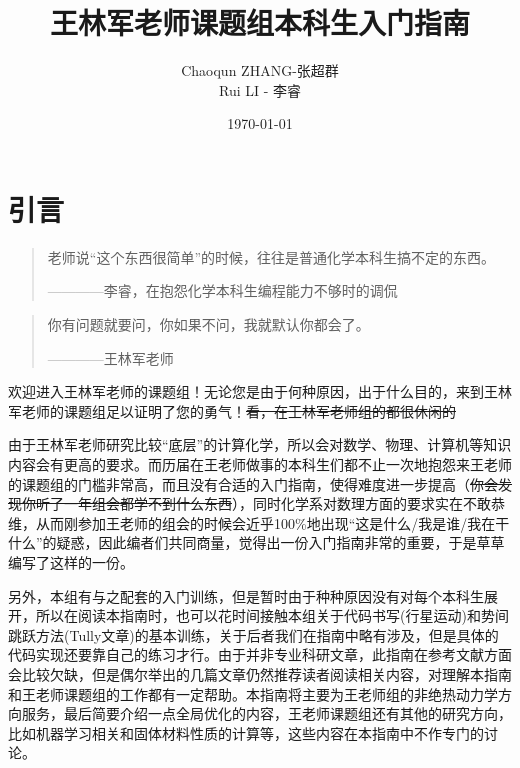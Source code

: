 \documentclass[12pt,a4paper,openany,twoside]{book}
\title{王林军老师课题组本科生入门指南}
\author{Chaoqun ZHANG-张超群\\Rui LI - 李睿}
\date{\today}
\numberwithin{equation}{section}
\begin{document}
    \maketitle
    \tableofcontents
    \setcounter{page}{1}   %
    \makeatletter
    \let\ps@plain\ps@empty
    \makeatother
    \tableofcontents                                    %
    \mainmatter\medskip    %
    
    
    
    \newpage
  \chapter*{引言}
  \begin{quote}
    老师说``这个东西很简单''的时候，往往是普通化学本科生搞不定的东西。
    \begin{flushright}
      ————李睿，在抱怨化学本科生编程能力不够时的调侃
    \end{flushright}
  \end{quote}
  \begin{quote}
    你有问题就要问，你如果不问，我就默认你都会了。
    \begin{flushright}
      ————王林军老师
    \end{flushright}
  \end{quote}

  欢迎进入王林军老师的课题组！无论您是由于何种原因，出于什么目的，来到王林军老师的课题组足以证明了您的勇气！\sout{看，在王林军老师组的都很休闲的}

  由于王林军老师研究比较``底层''的计算化学，所以会对数学、物理、计算机等知识内容会有更高的要求。而历届在王老师做事的本科生们都不止一次地抱怨来王老师的课题组的门槛非常高，而且没有合适的入门指南，使得难度进一步提高（\sout{你会发现你听了一年组会都学不到什么东西}），同时化学系对数理方面的要求实在不敢恭维，从而刚参加王老师的组会的时候会近乎100\%地出现``这是什么/我是谁/我在干什么''的疑惑，因此编者们共同商量，觉得出一份入门指南非常的重要，于是草草编写了这样的一份。

  另外，本组有与之配套的入门训练，但是暂时由于种种原因没有对每个本科生展开，所以在阅读本指南时，也可以花时间接触本组关于代码书写(行星运动)和势间跳跃方法(Tully文章)的基本训练，关于后者我们在指南中略有涉及，但是具体的代码实现还要靠自己的练习才行。由于并非专业科研文章，此指南在参考文献方面会比较欠缺，但是偶尔举出的几篇文章仍然推荐读者阅读相关内容，对理解本指南和王老师课题组的工作都有一定帮助。本指南将主要为王老师组的非绝热动力学方向服务，最后简要介绍一点全局优化的内容，王老师课题组还有其他的研究方向，比如机器学习相关和固体材料性质的计算等，这些内容在本指南中不作专门的讨论。
  
\end{document}
